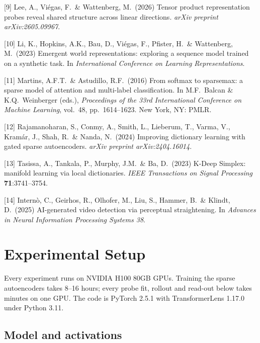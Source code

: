 \documentclass{article}
\begin{document}
{[9] Lee, A., Vi\'egas, F.\ \& Wattenberg, M.\ (2026) Tensor product representation probes reveal
shared structure across linear directions. {\it arXiv preprint arXiv:2605.09967}.


[10] Li, K., Hopkins, A.K., Bau, D., Vi\'egas, F., Pfister, H.\ \& Wattenberg, M.\ (2023) Emergent
world representations: exploring a sequence model trained on a synthetic task. In {\it
International Conference on Learning Representations}.


[11] Martins, A.F.T.\ \& Astudillo, R.F.\ (2016) From softmax to sparsemax: a sparse model of
attention and multi-label classification. In M.F.\ Balcan \& K.Q.\ Weinberger (eds.), {\it
Proceedings of the 33rd International Conference on Machine Learning}, vol.\ 48, pp.\ 1614--1623.
New York, NY: PMLR.


[12] Rajamanoharan, S., Conmy, A., Smith, L., Lieberum, T., Varma, V., Kram\'ar, J., Shah, R.\ \&
Nanda, N.\ (2024) Improving dictionary learning with gated sparse autoencoders. {\it arXiv
preprint arXiv:2404.16014}.


[13] Tasissa, A., Tankala, P., Murphy, J.M.\ \& Ba, D.\ (2023) K-Deep Simplex: manifold learning
via local dictionaries. {\it IEEE Transactions on Signal Processing} {\bf 71}:3741--3754.


[14] Intern\`o, C., Geirhos, R., Olhofer, M., Liu, S., Hammer, B.\ \& Klindt, D.\ (2025)
AI-generated video detection via perceptual straightening. In {\it Advances in Neural
Information Processing Systems 38}.
}




\appendix

\section{Experimental Setup}

Every experiment runs on NVIDIA H100 80GB GPUs. Training the sparse autoencoders takes 8--16
hours; every probe fit, rollout and read-out below takes minutes on one GPU. The code is PyTorch
2.5.1 with TransformerLens 1.17.0 under Python 3.11.

\subsection{Model and activations}
\end{document}

